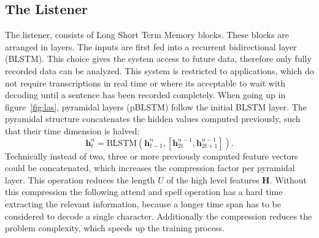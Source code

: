 \subsection{The Listener}
\label{subsec:Listener}
The listener, consists of Long Short Term Memory blocks. These blocks are arranged in layers. The inputs are first fed into a recurrent bidirectional layer (BLSTM). This choice gives the system access to future data, therefore only fully recorded data can be analyzed. This system is restricted to applications, which do not require transcriptions in real time or where its acceptable to wait with decoding until a sentence has been recorded completely. When going up in figure~\ref*{fig:las}, pyramidal layers (pBLSTM) follow the initial BLSTM layer. The pyramidal structure concatenates the hidden values computed previously, such that their time dimension is halved:
\begin{equation}
\mathbf{h}_{t}^n = \text{BLSTM}(\mathbf{h}_{t-1}^{n}, [\mathbf{h}_{2t}^{n-1}, \mathbf{h}_{2t+1}^{n-1}]).
\end{equation}
Technically instead of two, three or more previously computed feature vectors could be concatenated, which increases the compression factor per pyramidal layer.
This operation reduces the length $U$ of the high level features $\mathbf{H}$. Without this compression the following attend and spell operation has a hard time extracting the relevant information, because a longer time span has to be considered to decode a single character. Additionally the compression reduces the problem complexity, which speeds up the training process.

